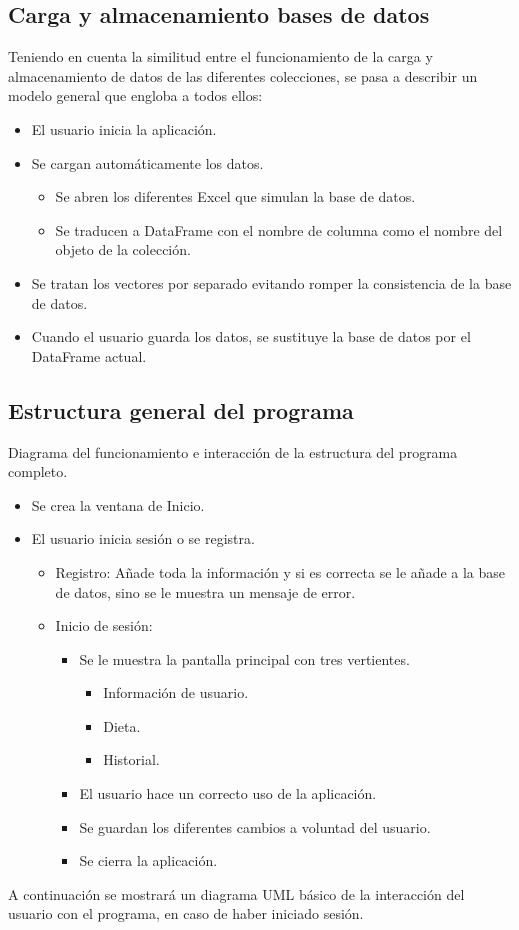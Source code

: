 \subsection{Carga y almacenamiento bases de datos}
Teniendo en cuenta la similitud entre el funcionamiento de la carga y almacenamiento de datos de las diferentes colecciones, se pasa a describir un modelo general que engloba a todos ellos:
\begin{itemize}
\item El usuario inicia la aplicación.
\item Se cargan automáticamente los datos.
\begin{itemize}
\item Se abren los diferentes Excel que simulan la base de datos.
\item Se traducen a DataFrame con el nombre de columna como el nombre del objeto de la colección.
\end{itemize}
\item Se tratan los vectores por separado evitando romper la consistencia de la base de datos.
\item Cuando el usuario guarda los datos, se sustituye la base de datos por el DataFrame actual.
\end{itemize}
\subsection{Estructura general del programa}
Diagrama del funcionamiento e interacción de la estructura del programa completo.
\begin{itemize}
\item Se crea la ventana de Inicio.
\item El usuario inicia sesión o se registra.
\begin{itemize}
\item Registro: Añade toda la información y si es correcta se le añade a la base de datos, sino se le muestra un mensaje de error.
\item Inicio de sesión:
\begin{itemize}
\item Se le muestra la pantalla principal con tres vertientes.
\begin{itemize}
\item Información de usuario.
\item Dieta.
\item Historial.
\end{itemize}
\item El usuario hace un correcto uso de la aplicación.
\item Se guardan los diferentes cambios a voluntad del usuario.
\item Se cierra la aplicación.
\end{itemize}
\end{itemize}
\end{itemize}
A continuación se mostrará un diagrama UML básico de la interacción del usuario con el programa, en caso de haber iniciado sesión.

